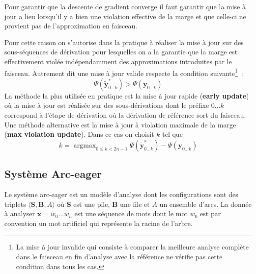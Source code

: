 \documentclass[11pt,openany]{book}
\begin{document}
Pour garantir que la descente de gradient converge il faut garantir
que la mise à jour a lieu lorsqu'il y a bien une violation effective de la marge
et que celle-ci ne provient pas de l'approximation en faisceau.

Pour cette raison on s'autorise dans la pratique à réaliser la mise à
jour sur des sous-séquences de dérivation pour lesquelles on a la
garantie que la marge est effectivement violée indépendamment des
approximations introduites par le faisceau. Autrement dit une mise à
jour valide respecte la condition suivante\footnote{
La mise à jour invalide qui consiste à comparer la meilleure analyse complète
dans le faisceau en fin d'analyse avec la référence ne vérifie pas cette condition dans tous les cas. 
}~:
\begin{equation}
\Psi(\tilde{\mathbf{y}}^*_{0\ldots k}) > \Psi(\mathbf{y}_{0\ldots k})
\end{equation}
La méthode la plus utilisée en pratique est la mise à jour rapide
({\bf early update}) où la mise à jour est réalisée sur des
sous-dérivations dont le préfixe $0\ldots k$ correspond à l'étape de
dérivation où la dérivation de référence sort du faisceau. Une méthode
alternative est la mise à jour à violation maximale de la marge ({\bf max violation update}). 
Dans ce cas on choisit $k$ tel que 
\begin{displaymath}
k = \mathop{\text{argmax}}_{0 \leq k
 < 2n-1}\Psi(\tilde{\mathbf{y}}^*_{0\ldots k}) -
\Psi(\mathbf{y}_{0\ldots k})
\end{displaymath}

\subsection{Système Arc-eager}

Le système arc-eager est un modèle d'analyse dont les configurations
sont des triplets $\langle \mathbf{S},\mathbf{B} ,  A\rangle$ où
$\mathbf{S}$ est une pile, $\mathbf{B}$ une file et $A$ un ensemble d'arcs.
La donnée à analyser $\mathbf{x} = w_0\ldots w_n$ est une séquence de mots
dont le mot $w_0$ est par convention un mot artificiel qui représente
la racine de l'arbre.
\end{document}

